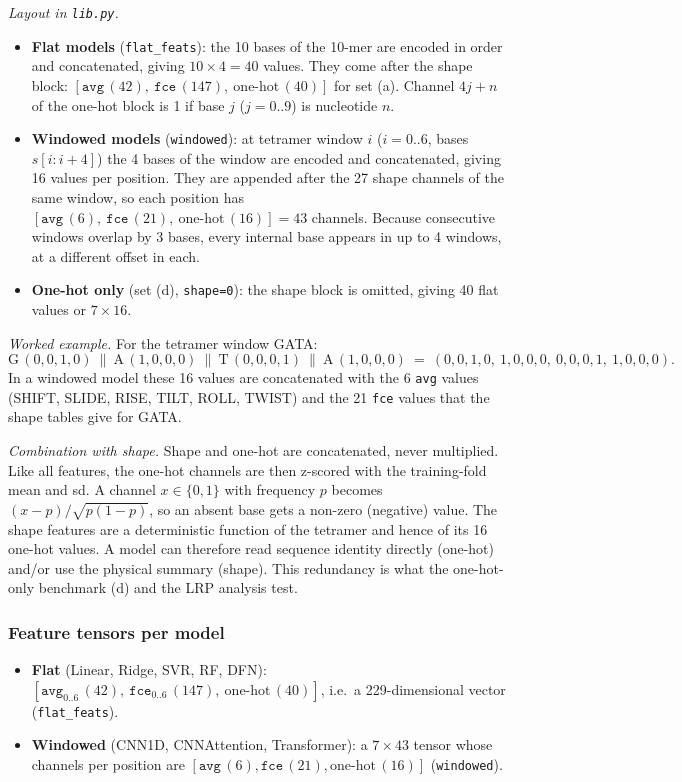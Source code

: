 \emph{Layout in \texttt{lib.py}.}
\begin{itemize}
\item \textbf{Flat models} (\texttt{flat\_feats}): the 10 bases of the 10-mer are encoded in order and concatenated, giving $10\times4=40$ values. They come after the shape block: $[\texttt{avg}\,(42),\ \texttt{fce}\,(147),\ \text{one-hot}\,(40)]$ for set (a). Channel $4j+n$ of the one-hot block is 1 if base $j$ ($j=0..9$) is nucleotide $n$.
\item \textbf{Windowed models} (\texttt{windowed}): at tetramer window $i$ ($i=0..6$, bases $s[i{:}i{+}4]$) the 4 bases of the window are encoded and concatenated, giving 16 values per position. They are appended after the 27 shape channels of the same window, so each position has $[\texttt{avg}\,(6),\ \texttt{fce}\,(21),\ \text{one-hot}\,(16)] = 43$ channels. Because consecutive windows overlap by 3 bases, every internal base appears in up to 4 windows, at a different offset in each.
\item \textbf{One-hot only} (set (d), \texttt{shape=0}): the shape block is omitted, giving 40 flat values or $7\times16$.
\end{itemize}

\emph{Worked example.} For the tetramer window GATA:
\[
\mathrm{G}\,(0,0,1,0)\ \|\ \mathrm{A}\,(1,0,0,0)\ \|\ \mathrm{T}\,(0,0,0,1)\ \|\ \mathrm{A}\,(1,0,0,0)\ =\ (0,0,1,0,\ 1,0,0,0,\ 0,0,0,1,\ 1,0,0,0).
\]
In a windowed model these 16 values are concatenated with the 6 \texttt{avg} values (SHIFT, SLIDE, RISE, TILT, ROLL, TWIST) and the 21 \texttt{fce} values that the shape tables give for GATA.

\emph{Combination with shape.} Shape and one-hot are concatenated, never multiplied. Like all features, the one-hot channels are then z-scored with the training-fold mean and sd. A channel $x\in\{0,1\}$ with frequency $p$ becomes $(x-p)/\sqrt{p(1-p)}$, so an absent base gets a non-zero (negative) value. The shape features are a deterministic function of the tetramer and hence of its 16 one-hot values. A model can therefore read sequence identity directly (one-hot) and/or use the physical summary (shape). This redundancy is what the one-hot-only benchmark (d) and the LRP analysis test.

\subsubsection{Feature tensors per model}
\begin{itemize}
\item \textbf{Flat} (Linear, Ridge, SVR, RF, DFN): $[\texttt{avg}_{0..6}\,(42),\ \texttt{fce}_{0..6}\,(147),\ \text{one-hot}\,(40)]$, i.e.\ a 229-dimensional vector (\texttt{flat\_feats}).
\item \textbf{Windowed} (CNN1D, CNNAttention, Transformer): a $7\times43$ tensor whose channels per position are $[\texttt{avg}\,(6),\texttt{fce}\,(21),\text{one-hot}\,(16)]$ (\texttt{windowed}).
\end{itemize}

